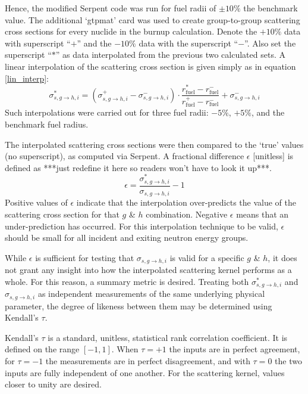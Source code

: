 \documentclass{physor2012}
\begin{document}
Hence, the modified Serpent code was run for fuel radii of $\pm 10\%$
the benchmark value. The additional `gtpmat' card was used to create
group-to-group scattering cross sections for every nuclide in the burnup calculation.
Denote the $+10\%$ data with superscript ``$+$'' and the $-10\%$ data with the
superscript ``$-$''.  Also set the superscript ``$*$'' as data interpolated
from the previous two calculated sets.  A linear interpolation of the
scattering cross section is given simply as in equation \ref{lin_interp}:
\begin{equation}
\label{lin_interp}
\sigma_{s,g\to h,i}^{*} = \left(\sigma_{s,g\to h,i}^{+} - \sigma_{s,g\to h,i}^{-}\right)\cdot
                          \frac{r_{\mbox{fuel}}^{*} - r_{\mbox{fuel}}^{-}}
                               {r_{\mbox{fuel}}^{+} - r_{\mbox{fuel}}^{-}} +
                          \sigma_{s,g\to h,i}^{-}
\end{equation}
Such interpolations were carried out for three fuel radii: $-5\%$, $+5\%$, and the
benchmark fuel radius.

The interpolated scattering cross sections were then compared to the `true'
values (no superscript), as computed via Serpent. A fractional difference
$\epsilon$ [unitless] is defined as ***just redefine it here so readers won't have to look it up***.
\begin{equation}
\label{epsilon_def}
\epsilon = \frac{\sigma_{s,g\to h,i}^{*}}{\sigma_{s,g\to h,i}} - 1
\end{equation}
Positive values of $\epsilon$ indicate that the interpolation over-predicts
the value of the scattering cross section for that $g$ \& $h$ combination.
Negative $\epsilon$ means that an under-prediction has occurred.  For this
interpolation technique to be valid, $\epsilon$ should be small for all
incident and exiting neutron energy groups.

While $\epsilon$ is sufficient for testing that $\sigma_{s,g\to h,i}$ is
valid for a specific $g$ \& $h$, it does not grant any insight into how the
interpolated scattering kernel performs as a whole.  For this reason, a summary
metric is desired.  Treating both $\sigma_{s,g\to h,i}^{*}$ and $\sigma_{s,g\to h,i}$
as independent measurements of the same underlying physical parameter, the degree of
likeness between them may be determined using Kendall's $\tau$.

Kendall's $\tau$ is a standard, unitless, statistical rank correlation coefficient.
It is defined on the range $[-1,1]$.  When $\tau=+1$ the inputs are in perfect agreement,
for $\tau=-1$ the measurements are in perfect disagreement, and with $\tau=0$ the
two inputs are fully independent of one another.  For the scattering kernel,
values closer to unity are desired.
\end{document}

